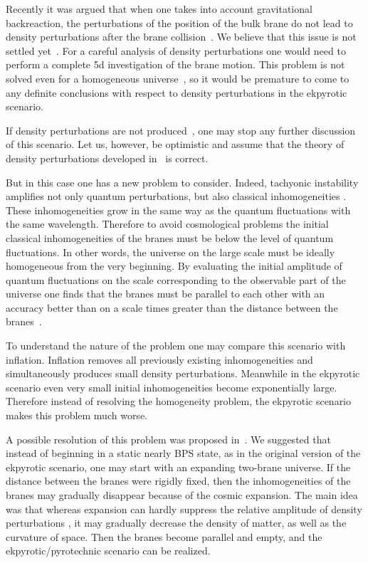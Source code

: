 \documentclass[a4paper,12pt]{article}
\begin{document}
Recently it was argued that when one takes into account gravitational backreaction, the perturbations of the position of the bulk brane do not lead to density perturbations after the brane collision~\cite{Lyth:2001pf}. We believe that this issue is not settled yet~\cite{KKLT}. For a careful analysis of density perturbations one would need to perform a complete 5d investigation of the brane motion. This problem is not solved even for a homogeneous universe~\cite{KKLT}, so it would be premature to come to any definite conclusions with respect to density perturbations in the ekpyrotic scenario.

If density perturbations are not produced~\cite{Lyth:2001pf}, one may stop any further discussion of this scenario. Let us, however, be optimistic and assume that the theory of density perturbations developed in~\cite{KOST,KKL} is correct.

But in this case one has a new problem to consider. Indeed, tachyonic instability amplifies not only quantum perturbations, but also classical inhomogeneities \cite{KKL}. These inhomogeneities grow in the same way as the quantum fluctuations with the same wavelength. Therefore to avoid cosmological problems the initial classical inhomogeneities of the branes must be below the level of quantum fluctuations. In other words, the universe on the large scale must be ideally homogeneous from the very beginning. By evaluating the initial amplitude of quantum fluctuations on the scale corresponding to the observable part of the universe one finds that the branes must be parallel to each other with an accuracy better than
\coordHE{} on a scale \coordHE{} times greater than the distance between
the branes~\cite{KKL}. 

To understand the nature of  the problem  one may compare this scenario
with inflation. Inflation removes all previously existing inhomogeneities  and simultaneously produces small density perturbations.  Meanwhile in the ekpyrotic scenario even very small initial inhomogeneities become exponentially large. Therefore instead of resolving the homogeneity problem, the ekpyrotic scenario makes this problem much worse. 



A possible resolution of this problem was proposed in~\cite{KKL}. We suggested that instead of beginning in a static nearly BPS state, as in the original version of the ekpyrotic scenario, one may start with an expanding two-brane universe. If the distance between the branes were rigidly fixed, then the inhomogeneities of the branes may gradually disappear because of the cosmic expansion. The main idea was that whereas expansion can hardly suppress the relative amplitude of density perturbations \myHighlight{${\delta\rho\over \rho}$}\coordHE{}, it may gradually decrease the density of matter, as well as the curvature of space. Then the branes become parallel and empty, and the ekpyrotic/pyrotechnic scenario can be realized.
\end{document}
